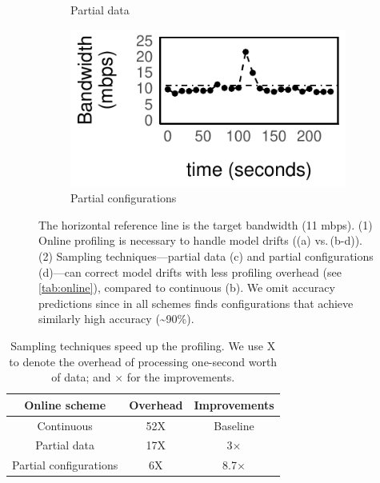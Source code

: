 \begin{figure}
\begin{subfigure}[t]{0.49\columnwidth}
    \caption{Partial data}
    \label{fig:online-partial}
  \end{subfigure}
  \hfill
  \begin{subfigure}[t]{0.49\columnwidth}
    \includegraphics[width=\textwidth]{figures/online4.pdf}
    \caption{Partial configurations}
    \label{fig:online-trigger}
  \end{subfigure}
  \caption{The horizontal reference line is the target bandwidth (11 mbps). (1)
    Online profiling is necessary to handle model drifts ((a) vs.\,(b-d)). (2)
    Sampling techniques---partial data (c) and partial configurations (d)---can
    correct model drifts with less profiling overhead (see
    \autoref{tab:online}), compared to continuous (b).  We omit accuracy
    predictions since in all schemes \sysname{} finds configurations that
    achieve similarly high accuracy (\textasciitilde 90\%).  }
  \label{fig:online-tricks}
\end{figure}


\begin{table}[t]
  \footnotesize
  \centering
  \begin{tabular}{c c c}
    \toprule
    Online scheme & Overhead & Improvements \\
    \midrule
    Continuous & 52X & Baseline \\
    Partial data & 17X & 3$\times$\\
    Partial configurations & 6X & 8.7$\times$ \\
    \bottomrule
  \end{tabular}
  \caption{Sampling techniques speed up the profiling. We use X to denote the
    overhead of processing one-second worth of data; and $\times$ for the
    improvements.}
  \label{tab:online}
\end{table}

